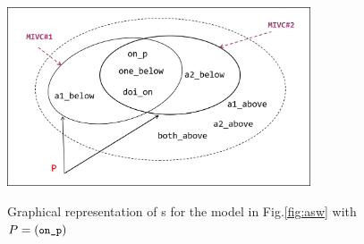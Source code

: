 
\begin{figure}[t]
 \centering
  \includegraphics[width=0.8\textwidth]{figs/ivcs.png}
  \label{fig:ivcs}
  \vspace{-0.1in}
  \caption{Graphical representation of \mivc s for the model in Fig.\ref{fig:asw}
  with  $P = (\small{\texttt{on\_p}})$}
\end{figure}




